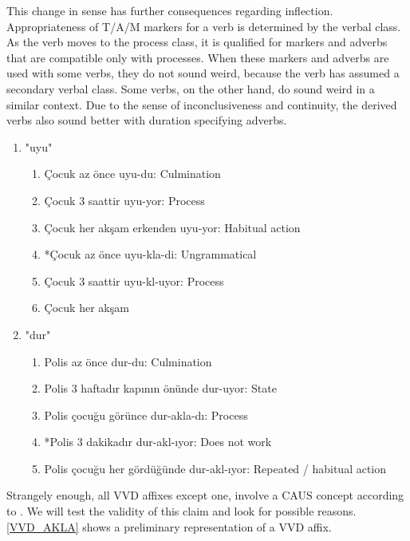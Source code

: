 \documentclass[11pt]{article} %
\begin{document}
This change in sense has further consequences regarding inflection. Appropriateness of T/A/M markers for a verb is determined by the verbal class. As the verb moves to the process class, it is qualified for markers and adverbs that are compatible only with processes. When these markers and adverbs are used with some verbs, they do not sound weird, because the verb has assumed a secondary verbal class. Some verbs, on the other hand, do sound weird in a similar context. Due to the sense of inconclusiveness and continuity, the derived verbs also sound better with duration specifying adverbs. \\

\begin{enumerate}[resume*]
	\item "uyu"
	\begin{enumerate}[label=(\alph*), ref=(\alph*)]\itemsep1pt
	\item Çocuk az önce uyu-du: Culmination
	\item Çocuk 3 saattir uyu-yor: Process
	\item Çocuk her akşam erkenden uyu-yor: Habitual action
	\item *Çocuk az önce uyu-kla-di: Ungrammatical
	\item Çocuk 3 saattir uyu-kl-uyor: Process
	\item Çocuk her akşam 
	\end{enumerate}
	
	\item "dur"
	\begin{enumerate}[label=(\alph*), ref=(\alph*)]\itemsep1pt
	\item Polis az önce dur-du: Culmination
	\item Polis 3 haftadır kapının önünde dur-uyor: State
	\item Polis çocuğu görünce dur-akla-dı: Process %
	\item *Polis 3 dakikadır dur-akl-ıyor: Does not work
	\item Polis çocuğu her gördüğünde dur-akl-ıyor: Repeated / habitual action
	\end{enumerate}
\end{enumerate}

Strangely enough, all VVD affixes except one, involve a CAUS concept according to \citet{Bozsahin2018}. We will test the validity of this claim and look for possible reasons. \ref{VVD_AKLA} shows a preliminary representation of a VVD affix.
\end{document}
